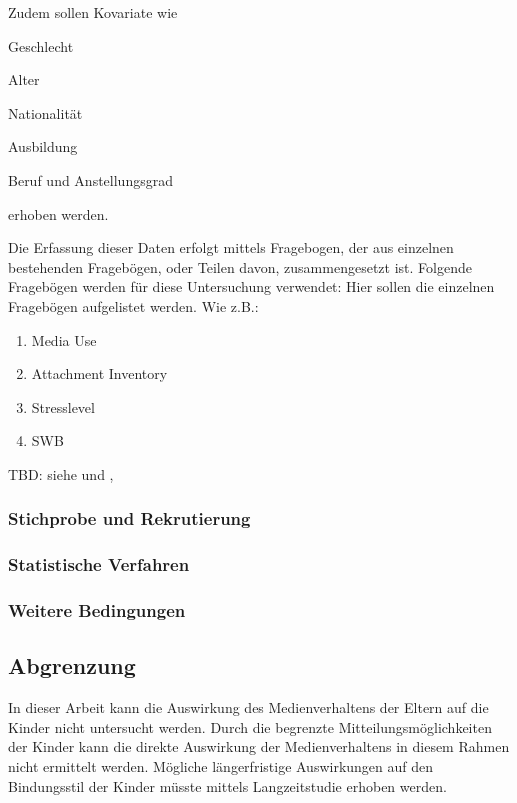 Zudem sollen Kovariate wie 
\begin{seriate}
    \item Geschlecht
    \item Alter
    \item Nationalität
    \item Ausbildung
    \item Beruf und Anstellungsgrad
\end{seriate}
erhoben werden.

Die Erfassung dieser Daten erfolgt mittels Fragebogen, der aus einzelnen bestehenden Fragebögen, oder Teilen davon, zusammengesetzt ist. Folgende Fragebögen werden für diese Untersuchung verwendet:
Hier sollen die einzelnen Fragebögen aufgelistet werden. Wie z.B.:
\begin{enumerate}
    \item Media Use
    \item Attachment Inventory
    \item Stresslevel
    \item SWB
\end{enumerate}

TBD: siehe \cite{AmericanAcademyofPediatrics2013} und \cite{Plowman2014}, \cite{Nikken2014}

\subsubsection{Stichprobe und Rekrutierung}
\subsubsection{Statistische Verfahren}
\subsubsection{Weitere Bedingungen}
\subsection{Abgrenzung}
In dieser Arbeit kann die Auswirkung des Medienverhaltens der Eltern auf die Kinder nicht untersucht werden. Durch die begrenzte Mitteilungsmöglichkeiten der Kinder kann die direkte Auswirkung der Medienverhaltens in diesem Rahmen nicht ermittelt werden. Mögliche längerfristige Auswirkungen auf den Bindungsstil der Kinder müsste mittels Langzeitstudie erhoben werden. 
